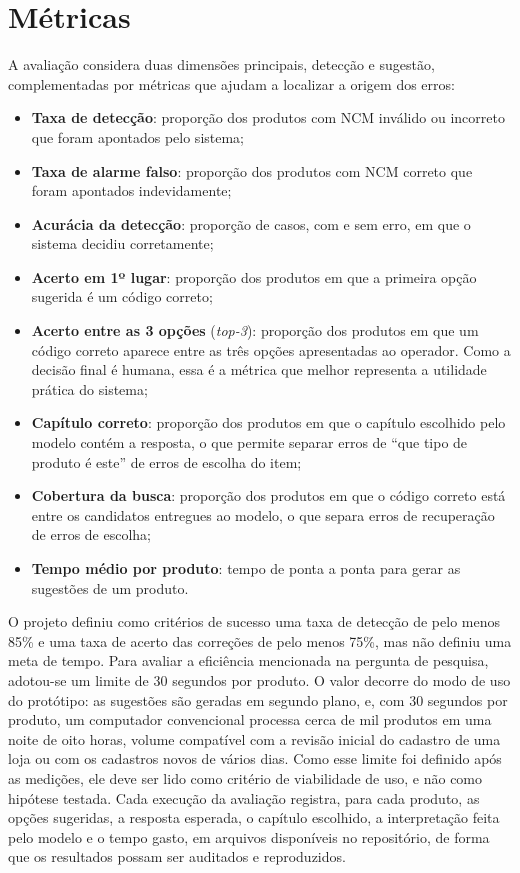 \section{Métricas}

A avaliação considera duas dimensões principais, detecção e sugestão, complementadas por métricas que ajudam a localizar a origem dos erros:

\begin{itemize}
    \item \textbf{Taxa de detecção}: proporção dos produtos com NCM inválido ou incorreto que foram apontados pelo sistema;
    \item \textbf{Taxa de alarme falso}: proporção dos produtos com NCM correto que foram apontados indevidamente;
    \item \textbf{Acurácia da detecção}: proporção de casos, com e sem erro, em que o sistema decidiu corretamente;
    \item \textbf{Acerto em 1º lugar}: proporção dos produtos em que a primeira opção sugerida é um código correto;
    \item \textbf{Acerto entre as 3 opções} (\textit{top-3}): proporção dos produtos em que um código correto aparece entre as três opções apresentadas ao operador. Como a decisão final é humana, essa é a métrica que melhor representa a utilidade prática do sistema;
    \item \textbf{Capítulo correto}: proporção dos produtos em que o capítulo escolhido pelo modelo contém a resposta, o que permite separar erros de ``que tipo de produto é este'' de erros de escolha do item;
    \item \textbf{Cobertura da busca}: proporção dos produtos em que o código correto está entre os candidatos entregues ao modelo, o que separa erros de recuperação de erros de escolha;
    \item \textbf{Tempo médio por produto}: tempo de ponta a ponta para gerar as sugestões de um produto.
\end{itemize}

O projeto definiu como critérios de sucesso uma taxa de detecção de pelo menos 85\% e uma taxa de acerto das correções de pelo menos 75\%, mas não definiu uma meta de tempo. Para avaliar a eficiência mencionada na pergunta de pesquisa, adotou-se um limite de 30 segundos por produto. O valor decorre do modo de uso do protótipo: as sugestões são geradas em segundo plano, e, com 30 segundos por produto, um computador convencional processa cerca de mil produtos em uma noite de oito horas, volume compatível com a revisão inicial do cadastro de uma loja ou com os cadastros novos de vários dias. Como esse limite foi definido após as medições, ele deve ser lido como critério de viabilidade de uso, e não como hipótese testada. Cada execução da avaliação registra, para cada produto, as opções sugeridas, a resposta esperada, o capítulo escolhido, a interpretação feita pelo modelo e o tempo gasto, em arquivos disponíveis no repositório, de forma que os resultados possam ser auditados e reproduzidos.

